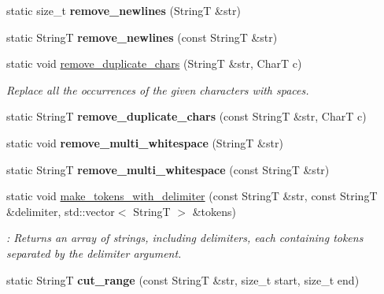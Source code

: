 \begin{CompactItemize}
\item 
\hypertarget{classAlgorithm_5b347e21063884df4bf75518e0614f00}{
static size\_\-t \textbf{remove\_\-newlines} (StringT \&str)}
\label{classAlgorithm_5b347e21063884df4bf75518e0614f00}

\item 
\hypertarget{classAlgorithm_1a74a400e5ca203f88bf788fc7963dcc}{
static StringT \textbf{remove\_\-newlines} (const StringT \&str)}
\label{classAlgorithm_1a74a400e5ca203f88bf788fc7963dcc}

\item 
static void \hyperlink{classAlgorithm_114fe02302e735017ae2277a1b173e96}{remove\_\-duplicate\_\-chars} (StringT \&str, CharT c)
\begin{CompactList}\small\item\em Replace all the occurrences of the given characters with spaces. \item\end{CompactList}\item 
\hypertarget{classAlgorithm_fe5e209fc1275c48aee815e1fdb7dc3b}{
static StringT \textbf{remove\_\-duplicate\_\-chars} (const StringT \&str, CharT c)}
\label{classAlgorithm_fe5e209fc1275c48aee815e1fdb7dc3b}

\item 
\hypertarget{classAlgorithm_9a7e5575ed6a557db7f4ac09d249a6de}{
static void \textbf{remove\_\-multi\_\-whitespace} (StringT \&str)}
\label{classAlgorithm_9a7e5575ed6a557db7f4ac09d249a6de}

\item 
\hypertarget{classAlgorithm_1780cd9a31bd71d8d53d555f7c3f5762}{
static StringT \textbf{remove\_\-multi\_\-whitespace} (const StringT \&str)}
\label{classAlgorithm_1780cd9a31bd71d8d53d555f7c3f5762}

\item 
\hypertarget{classAlgorithm_0bf91d2a040a351606db364cf9ebfbf3}{
static void \hyperlink{classAlgorithm_0bf91d2a040a351606db364cf9ebfbf3}{make\_\-tokens\_\-with\_\-delimiter} (const StringT \&str, const StringT \&delimiter, std::vector$<$ StringT $>$ \&tokens)}
\label{classAlgorithm_0bf91d2a040a351606db364cf9ebfbf3}

\begin{CompactList}\small\item\em : Returns an array of strings, including delimiters, each containing tokens separated by the delimiter argument. \item\end{CompactList}\item 
\hypertarget{classAlgorithm_3085971e7207d71572b7385420a55417}{
static StringT \textbf{cut\_\-range} (const StringT \&str, size\_\-t start, size\_\-t end)}
\label{classAlgorithm_3085971e7207d71572b7385420a55417}


\end{CompactItemize}
